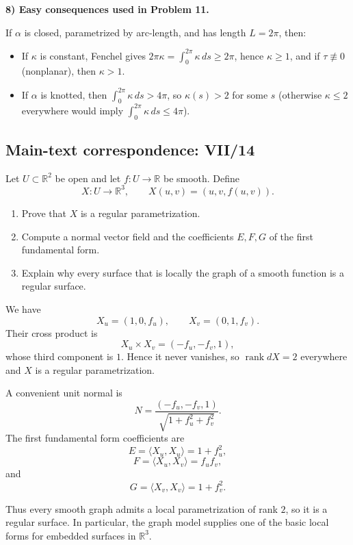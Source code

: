 \begin{solution}
	\par\medskip\noindent\textbf{8) Easy consequences used in Problem 11.}\par\smallskip

	If $\alpha$ is closed, parametrized by arc-length, and has length $L=2\pi$, then:
	\begin{itemize}
		\item If $\kappa$ is constant, Fenchel gives $2\pi\kappa=\int_0^{2\pi}\kappa\,ds\ge 2\pi$, hence $\kappa\ge 1$,
		and if $\tau\not\equiv 0$ (nonplanar), then $\kappa>1$.
		\item If $\alpha$ is knotted, then $\int_0^{2\pi}\kappa\,ds>4\pi$, so $\kappa(s)>2$ for some $s$
		(otherwise $\kappa\le 2$ everywhere would imply $\int_0^{2\pi}\kappa\,ds\le 4\pi$).
	\end{itemize}
\end{solution}

\subsection*{Main-text correspondence: VII/14}

\begin{problem}
\label{prob:cp-vii-0043}
Let \(U\subset\mathbb R^2\) be open and let \(f:U\to\mathbb R\) be smooth.
Define
\[
X:U\longrightarrow\mathbb R^3,
\qquad
X(u,v)=(u,v,f(u,v)).
\]

\begin{enumerate}
\item Prove that \(X\) is a regular parametrization.
\item Compute a normal vector field and the coefficients \(E,F,G\) of the
first fundamental form.
\item Explain why every surface that is locally the graph of a smooth function
is a regular surface.
\end{enumerate}
\end{problem}

\begin{solution}
We have
\[
X_u=(1,0,f_u),
\qquad
X_v=(0,1,f_v).
\]
Their cross product is
\[
X_u\times X_v=(-f_u,-f_v,1),
\]
whose third component is \(1\). Hence it never vanishes, so
\(\operatorname{rank}dX=2\) everywhere and \(X\) is a regular parametrization.

A convenient unit normal is
\[
N=
\frac{(-f_u,-f_v,1)}
{\sqrt{1+f_u^2+f_v^2}}.
\]
The first fundamental form coefficients are
\[
E=\langle X_u,X_u\rangle=1+f_u^2,
\]
\[
F=\langle X_u,X_v\rangle=f_uf_v,
\]
and
\[
G=\langle X_v,X_v\rangle=1+f_v^2.
\]

Thus every smooth graph admits a local parametrization of rank \(2\), so it is
a regular surface. In particular, the graph model supplies one of the basic
local forms for embedded surfaces in \(\mathbb R^3\).
\end{solution}


